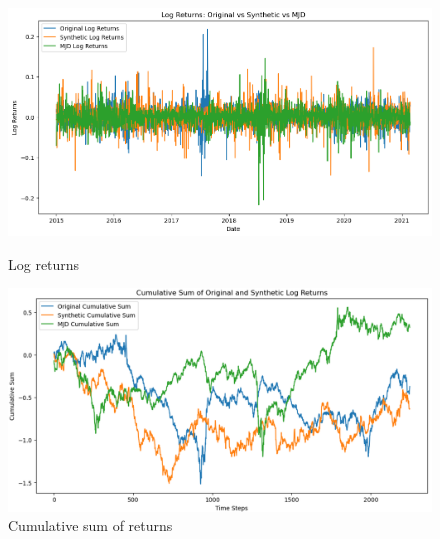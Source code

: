 \documentclass[12pt]{article}
\numberwithin{equation}{section}
\begin{document}
\begin{figure}[h!]
    \centering
    \begin{minipage}{0.48\textwidth}
        \centering
        \includegraphics[width=\linewidth]{logreturns.png}
        \caption{Log returns}
        \label{fig:compdists}
    \end{minipage}
    \hfill
    \begin{minipage}{0.48\textwidth}
        \centering
        \includegraphics[width=\linewidth]{cumsum.png}
        \caption{Cumulative sum of returns}
        \label{fig:pricepath}
    \end{minipage}
\end{figure}
\end{document}
